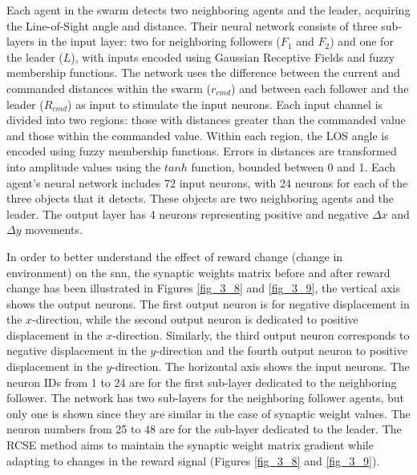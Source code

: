 Each agent in the swarm detects two neighboring agents and the leader, acquiring the Line-of-Sight angle and distance. Their neural network consists of three sub-layers in the input layer: two for neighboring followers (\(F_{1}\) and \(F_{2}\)) and one for the leader (\(L\)), with inputs encoded using Gaussian Receptive Fields and fuzzy membership functions. The network uses the difference between the current and commanded distances within the swarm ($r_{cmd}$) and between each follower and the leader ($R_{cmd}$) as input to stimulate the input neurons. Each input channel is divided into two regions: those with distances greater than the commanded value and those within the commanded value. Within each region, the LOS angle is encoded using fuzzy membership functions. Errors in distances are transformed into amplitude values using the \(tanh\) function, bounded between 0 and 1. Each agent's neural network includes 72 input neurons, with 24 neurons for each of the three objects that it detects. These objects are two neighboring agents and the leader. The output layer has 4 neurons representing positive and negative \(\Delta x\) and \(\Delta y\) movements.

In order to better understand the effect of reward change (change in environment) on the \ac{snn}, the synaptic weights matrix before and after reward change has been illustrated in Figures \ref{fig_3_8} and \ref{fig_3_9}, the vertical axis shows the output neurons. The first output neuron is for negative displacement in the $x$-direction, while the second output neuron is dedicated to positive displacement in the $x$-direction. Similarly, the third output neuron corresponds to negative displacement in the $y$-direction and the fourth output neuron to positive displacement in the $y$-direction. The horizontal axis shows the input neurons. The neuron IDs from 1 to 24 are for the first sub-layer dedicated to the neighboring follower. The network has two sub-layers for the neighboring follower agents, but only one is shown since they are similar in the case of synaptic weight values. The neuron numbers from 25 to 48 are for the sub-layer dedicated to the leader. The \ac{RCSE} method aims to maintain the synaptic weight matrix gradient while adapting to changes in the reward signal (Figures \ref{fig_3_8} and \ref{fig_3_9}).

